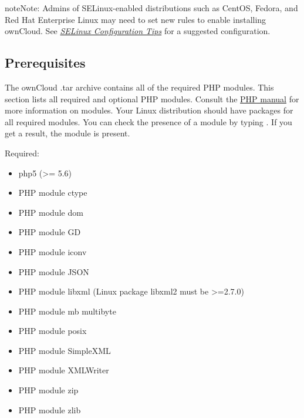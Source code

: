 \documentclass[letterpaper,10pt,english]{sphinxmanual}
\begin{document}
\begin{notice}{note}{Note:}
Admins of SELinux-enabled distributions such as CentOS, Fedora, and
Red Hat Enterprise Linux may need to set new rules to enable installing
ownCloud. See {\hyperref[installation/source_installation:selinux-tips-label]{\emph{SELinux Configuration Tips}}} for a suggested configuration.
\end{notice}


\subsection{Prerequisites}
\label{installation/source_installation:prerequisites}\label{installation/source_installation:prerequisites-label}
The ownCloud .tar archive contains all of the required PHP modules. This section
lists all required and optional PHP modules.  Consult the \href{http://php.net/manual/en/extensions.php}{PHP manual} for more information on modules.
Your Linux distribution should have packages for all required modules. You can
check the presence of a module by typing .
If you get a result, the module is present.

Required:
\begin{itemize}
\item {} 
php5 (\textgreater{}= 5.6)

\item {} 
PHP module ctype

\item {} 
PHP module dom

\item {} 
PHP module GD

\item {} 
PHP module iconv

\item {} 
PHP module JSON

\item {} 
PHP module libxml (Linux package libxml2 must be \textgreater{}=2.7.0)

\item {} 
PHP module mb multibyte

\item {} 
PHP module posix

\item {} 
PHP module SimpleXML

\item {} 
PHP module XMLWriter

\item {} 
PHP module zip

\item {} 
PHP module zlib

\end{itemize}
\end{document}
